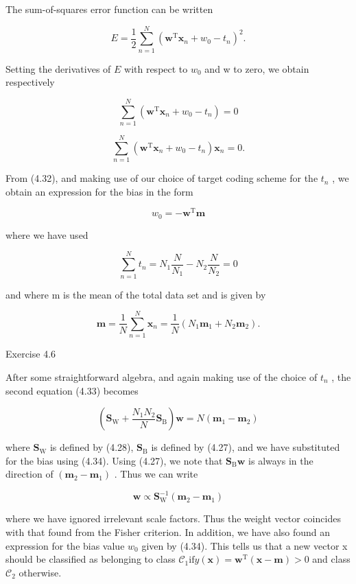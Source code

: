 \documentclass[
  10
]{article}
\begin{document}
The sum-of-squares error function can be written

\[
E = \frac {1}{2} \sum_ {n = 1} ^ {N} \left(\mathbf {w} ^ {\mathrm{T}} \mathbf {x} _ {n} + w _ {0} - t _ {n}\right) ^ {2}.\tag{4.31}
\]

Setting the derivatives of \(E\) with respect to \(w _ { 0 }\) and w to
zero, we obtain respectively

\[
\sum_ {n = 1} ^ {N} \left(\mathbf {w} ^ {\mathrm{T}} \mathbf {x} _ {n} + w _ {0} - t _ {n}\right) = 0\tag{4.32}
\]

\[
\sum_ {n = 1} ^ {N} \left(\mathbf {w} ^ {\mathrm{T}} \mathbf {x} _ {n} + w _ {0} - t _ {n}\right) \mathbf {x} _ {n} = 0.\tag{4.33}
\]

From (4.32), and making use of our choice of target coding scheme for
the \(t _ { n }\) , we obtain an expression for the bias in the form

\[
w _ {0} = - \mathbf {w} ^ {\mathrm{T}} \mathbf {m}\tag{4.34}
\]

where we have used

\[
\sum_ {n = 1} ^ {N} t _ {n} = N _ {1} \frac {N}{N _ {1}} - N _ {2} \frac {N}{N _ {2}} = 0\tag{4.35}
\]

and where m is the mean of the total data set and is given by

\[
\mathbf {m} = \frac {1}{N} \sum_ {n = 1} ^ {N} \mathbf {x} _ {n} = \frac {1}{N} (N _ {1} \mathbf {m} _ {1} + N _ {2} \mathbf {m} _ {2}).\tag{4.36}
\]

Exercise 4.6

After some straightforward algebra, and again making use of the choice
of \(t _ { n }\) , the second equation (4.33) becomes

\[
\left(\mathbf {S} _ {\mathrm{W}} + \frac {N _ {1} N _ {2}}{N} \mathbf {S} _ {\mathrm{B}}\right) \mathbf {w} = N (\mathbf {m} _ {1} - \mathbf {m} _ {2})\tag{4.37}
\]

where \(\mathbf { S } _ { \mathrm { W } }\) is defined by (4.28),
\(\mathbf { S } _ { \mathrm { B } }\) is defined by (4.27), and we have
substituted for the bias using (4.34). Using (4.27), we note that
\(\mathbf { S } _ { \mathrm { B } } \mathbf { w }\) is always in the
direction of
\(\left( \mathbf { m } _ { 2 } - \mathbf { m } _ { 1 } \right)\) . Thus
we can write

\[
\mathbf {w} \propto \mathbf {S} _ {\mathrm{W}} ^ {- 1} (\mathbf {m} _ {2} - \mathbf {m} _ {1})\tag{4.38}
\]

where we have ignored irrelevant scale factors. Thus the weight vector
coincides with that found from the Fisher criterion. In addition, we
have also found an expression for the bias value \(w _ { 0 }\) given by
(4.34). This tells us that a new vector x should be classified as
belonging to class
\(\mathcal { C } _ { 1 } \mathrm { i f } y ( \mathbf { x } ) = \mathbf { w } ^ { \mathrm { T } } ( \mathbf { x } - \mathbf { m } ) > 0\)
and class \(\mathcal { C } _ { 2 }\) otherwise.
\end{document}
